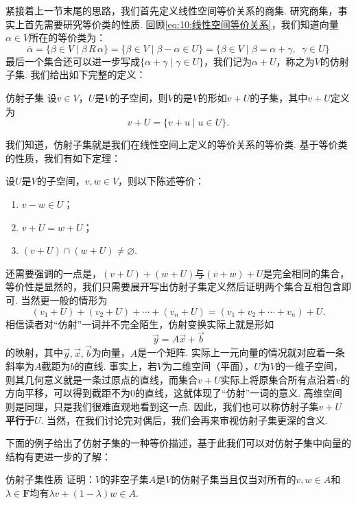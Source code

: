紧接着上一节末尾的思路，我们首先定义线性空间等价关系的商集. 研究商集，事实上首先需要研究等价类的性质. 回顾\autoref{eq:10:线性空间等价关系}，我们知道向量$\alpha\in V$所在的等价类为：
\[\overline{\alpha}=\{\beta\in V \mid \beta\,R\,\alpha\}=\{\beta\in V \mid \beta-\alpha\in U\}=\{\beta\in V \mid \beta=\alpha+\gamma,\enspace\gamma\in U\}\]
最后一个集合还可以进一步写成$\{\alpha+\gamma \mid \gamma\in U\}$，我们记为$\alpha+U$，称之为$V$的仿射子集. 我们给出如下完整的定义：
\begin{definition}{仿射子集}{} 
    设$v\in V$，$U$是$V$的子空间，则$V$的是$V$的形如$v+U$的子集，其中$v+U$定义为
    \[v+U=\{v+u \mid u\in U\}.\]
\end{definition}
我们知道，仿射子集就是我们在线性空间上定义的等价关系的等价类. 基于等价类的性质，我们有如下定理：
\begin{theorem}{}{}
    设$U$是$V$的子空间，$v,w\in V$，则以下陈述等价：
    \begin{enumerate}
        \item $v-w\in U$；
        \item $v+U=w+U$；
        \item $(v+U)\cap(w+U)\neq \varnothing$.
    \end{enumerate}
\end{theorem}

还需要强调的一点是，$(v+U)+(w+U)$与$(v+w)+U$是完全相同的集合，等价性是显然的，我们只需要展开写出仿射子集定义然后证明两个集合互相包含即可. 当然更一般的情形为
\[(v_1+U)+(v_2+U)+\cdots+(v_n+U)=(v_1+v_2+\cdots+v_n)+U.\]
相信读者对``仿射''一词并不完全陌生，仿射变换实际上就是形如\[\vec{y}=A\vec{x}+\vec{b}\]的映射，其中$\vec{y},\vec{x},\vec{b}$为向量，$A$是一个矩阵. 实际上一元向量的情况就对应着一条斜率为$A$截距为$b$的直线. 事实上，若$V$为二维空间（平面），$U$为$V$的一维子空间，则其几何意义就是一条过原点的直线，而集合$v+U$实际上将原集合所有点沿着$v$的方向平移，可以得到截距不为0的直线，这就体现了``仿射''一词的意义. 高维空间则是同理，只是我们很难直观地看到这一点. 因此，我们也可以称仿射子集$v+U$\textbf{\heiti 平行于}$U$. 当然，在我们讨论完对偶后，我们会再来审视仿射子集更深的含义.

下面的例子给出了仿射子集的一种等价描述，基于此我们可以对仿射子集中向量的结构有更进一步的了解：
\begin{example}{}{仿射子集性质}
    证明：$V$的非空子集$A$是$V$的仿射子集当且仅当对所有的$v,w\in A$和$\lambda\in\mathbf{F}$均有$\lambda v+(1-\lambda)w\in A$.
\end{example}

